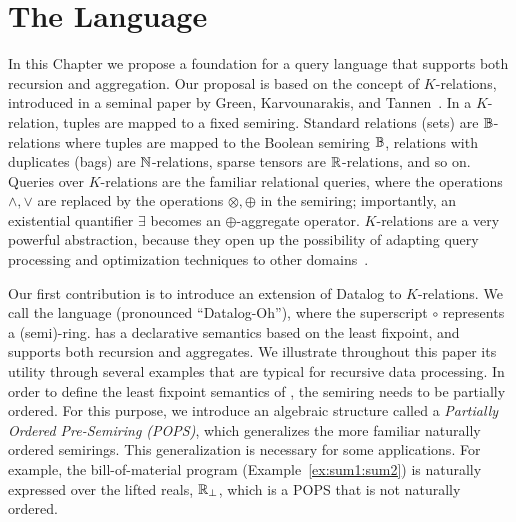 \chapter{The \datalogo Language}
\label{chap:datalogo}

In this Chapter we propose a foundation for a query language that
supports both recursion and aggregation.  Our proposal is based on the
concept of $K$-relations, introduced in a seminal
paper by Green, Karvounarakis, and Tannen~\cite{DBLP:conf/pods/GreenKT07}.
In a $K$-relation, tuples are
mapped to a fixed semiring. Standard relations (sets) are
$\mathbb B$-relations where tuples are mapped to the Boolean semiring $\mathbb B$,
relations with duplicates (bags) are $\mathbb N$-relations, sparse tensors
are $\mathbb R$-relations, and so on.  Queries over $K$-relations are the
familiar relational queries, where the operations $\wedge, \vee$ are
replaced by the operations $\otimes, \oplus$ in the semiring;
importantly, an existential quantifier $\exists$ becomes an
$\oplus$-aggregate operator.
$K$-relations are a very powerful abstraction, because they open up
the possibility of adapting query processing and optimization
techniques to other domains~\cite{DBLP:conf/pods/KhamisNR16}.

Our first contribution is to introduce an extension of Datalog to
$K$-relations.  We call the language \datalogo 
 (pronounced ``Datalog-Oh''),
 where the superscript
$\circ$ represents a (semi)-ring. \datalogo has a declarative semantics
based on the least fixpoint, and supports both recursion and
aggregates.  We illustrate throughout this paper its utility through
several examples that are typical for recursive data processing.  In
order to define the least fixpoint semantics of \datalogo, the semiring
needs to be partially ordered.  For this purpose, we introduce an
algebraic structure called a {\em Partially Ordered Pre-Semiring (POPS)\/},
which generalizes the more familiar naturally ordered semirings.  This
generalization is necessary for some applications.  For example, the
bill-of-material program (Example~\ref{ex:sum1:sum2}) is naturally
expressed over the lifted reals, $\mathbb R_\bot$, which is a POPS that is
not naturally ordered.


